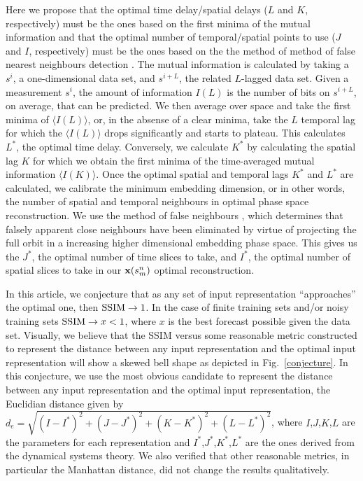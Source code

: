 \documentclass[journal]{IEEEtran}
\begin{document}
Here we propose that the optimal time delay/spatial delays ($L$ and $K$, respectively) must be the ones based on the first minima of the mutual 
information \cite{Fraser86, abarbanel1997analysis, opac-b1092652} and that the optimal number of temporal/spatial points to use ($J$ and $I$, 
respectively) must be the ones based on the  the method of method of false nearest neighbours detection \cite{1992PhRvA..45.3403K, 
1992PhRvA..45.7058M, 1993RvMP...65.1331A, 1996PhT....49k..86A, abarbanel1997analysis}.  The mutual information is calculated by taking a $s^{i}$, a 
one-dimensional data set, and $s^{i+L}$, the related $L$-lagged data set. Given a measurement $s^i$, the amount of information $I(L)$ is the number 
of bits on $s^{i+L}$, on average, that can be predicted. We then average over space and take the first minima of $\langle I(L) \rangle$, or, in the 
absense of a clear minima, take the $L$ temporal lag for which the $\langle I(L) \rangle$ drops significantly and starts to plateau. This calculates 
$L^*$, the optimal time delay. Conversely, we calculate $K^*$ by calculating the spatial lag $K$ for which we obtain the first minima of the 
time-averaged mutual information $\langle I(K) \rangle$. Once the optimal spatial and temporal lags $K^*$ and $L^*$ are calculated, we calibrate 
the minimum embedding dimension, or in other words, the number of spatial and temporal neighbours in optimal  
phase space reconstruction. We use the method of false neighbours \cite{1992PhRvA..45.3403K, 1992PhRvA..45.7058M,1993RvMP...65.1331A},
which determines that falsely apparent close neighbours have been 
eliminated by virtue of projecting the full orbit in a increasing higher dimensional embedding phase space. This gives us the 
$J^*$, the optimal number of time slices to take,
and $I^*$, the optimal number of spatial slices to take in our ${\bf x}(s^n_m)$ optimal reconstruction.

In this article, we conjecture that as any set of input representation 
``approaches'' the optimal one, then $\textnormal{SSIM} \to 1$. In the case of finite training sets and/or noisy training sets  
$\textnormal{SSIM} \to x<1$, where $x$ is the best  forecast possible given the data set. Visually, we believe that the SSIM versus some reasonable 
metric constructed to  represent the distance between any input representation and the optimal  input representation will show a skewed bell shape 
as depicted in Fig.\ \ref{conjecture}. In this conjecture, we use  the most obvious candidate to represent the distance between any  input 
representation  and the optimal   input representation, the Euclidian distance given by   
$d_e=\sqrt{(I-I^*)^2+(J-J^*)^2+(K-K^*)^2+(L-L^*)^2}$, where $I$,$J$,$K$,$L$ are the parameters for each representation
and $I^*$,$J^*$,$K^*$,$L^*$ are the ones derived from the dynamical systems theory. We also verified that other reasonable metrics,   
in particular the Manhattan  distance\cite{0486252027}, did 
not change the results qualitatively.
 
\end{document}
